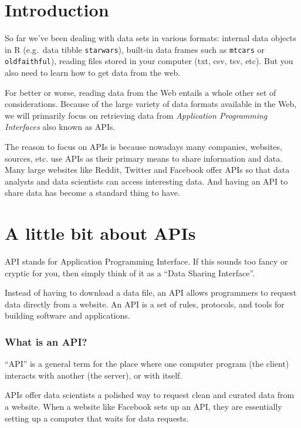 \documentclass[
]{book}
\begin{document}
\hypertarget{introduction-1}{%
\section{Introduction}\label{introduction-1}}

So far we've been dealing with data sets in various formats: internal data
objects in R (e.g.~data tibble \texttt{starwars}), built-in data frames such as
\texttt{mtcars} or \texttt{oldfaithful}), reading files stored in your computer (txt, csv,
tsv, etc). But you also need to learn how to get data from the web.

For better or worse, reading data from the Web entails a whole other set of
considerations. Because of the large variety of data formats available in the
Web, we will primarily focus on retrieving data from
\emph{Application Programming Interfaces} also known as APIs.

The reason to focus on APIs is because nowadays many companies, websites,
sources, etc. use APIs as their primary means to share information and data.
Many large websites like Reddit, Twitter and Facebook offer APIs so that data
analysts and data scientists can access interesting data. And having an API to
share data has become a standard thing to have.

\hypertarget{a-little-bit-about-apis}{%
\section{A little bit about APIs}\label{a-little-bit-about-apis}}

API stands for Application Programming Interface. If this sounds too fancy or
cryptic for you, then simply think of it as a ``Data Sharing Interface''.

Instead of having to download a data file, an API allows programmers to request
data directly from a website. An API is a set of rules, protocols, and tools
for building software and applications.

\hypertarget{what-is-an-api}{%
\subsubsection*{What is an API?}\label{what-is-an-api}}

``API'' is a general term for the place where one computer program (the client)
interacts with another (the server), or with itself.

APIs offer data scientists a polished way to request clean and curated data
from a website. When a website like Facebook sets up an API, they are
essentially setting up a computer that waits for data requests.
\end{document}
